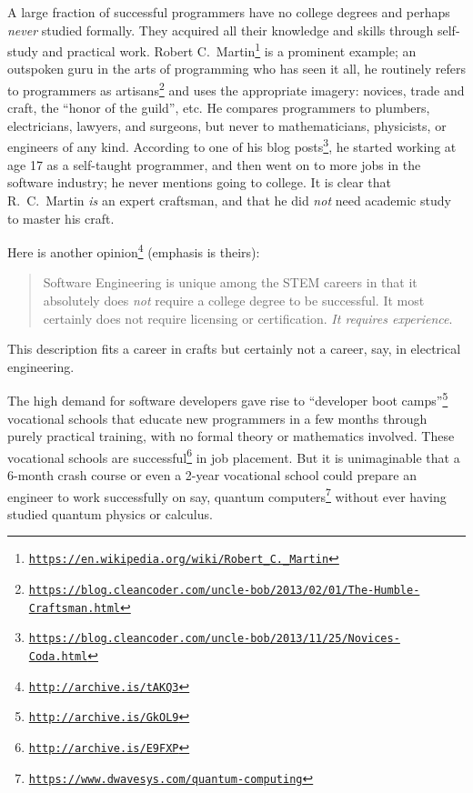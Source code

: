 A large fraction of successful programmers have no college degrees
and perhaps \emph{never} studied formally. They acquired all their
knowledge and skills through self-study and practical work. Robert
C.~Martin\footnote{\texttt{\href{https://en.wikipedia.org/wiki/Robert_C._Martin}{https://en.wikipedia.org/wiki/Robert\_C.\_Martin}}}
is a prominent example; an outspoken guru in the arts of programming
who has seen it all, he routinely refers to programmers as artisans\footnote{\texttt{\href{https://blog.cleancoder.com/uncle-bob/2013/02/01/The-Humble-Craftsman.html}{https://blog.cleancoder.com/uncle-bob/2013/02/01/The-Humble-Craftsman.html}}}
and uses the appropriate imagery: novices, trade and craft, the ``honor
of the guild'', etc. He compares programmers to plumbers, electricians,
lawyers, and surgeons, but never to mathematicians, physicists, or
engineers of any kind. According to one of his blog posts\footnote{\texttt{\href{https://blog.cleancoder.com/uncle-bob/2013/11/25/Novices-Coda.html}{https://blog.cleancoder.com/uncle-bob/2013/11/25/Novices-Coda.html}}},
he started working at age 17 as a self-taught programmer, and then
went on to more jobs in the software industry; he never mentions going
to college. It is clear that R.~C.~Martin \emph{is} an expert craftsman,
and that he did \emph{not} need academic study to master his craft.

Here is another opinion\footnote{\texttt{\href{http://archive.is/tAKQ3}{http://archive.is/tAKQ3}}}
(emphasis is theirs):
\begin{quotation}
{\small{}Software Engineering is unique among the STEM careers in
that it absolutely does }\emph{\small{}not}{\small{} require a college
degree to be successful. It most certainly does not require licensing
or certification. }\emph{\small{}It requires experience}{\small{}.}{\small\par}
\end{quotation}
This description fits a career in crafts \textendash{} but certainly
not a career, say, in electrical engineering.

The high demand for software developers gave rise to ``developer
boot camps''\footnote{\texttt{\href{http://archive.is/GkOL9}{http://archive.is/GkOL9}}}
\textemdash{} vocational schools that educate new programmers in a
few months through purely practical training, with no formal theory
or mathematics involved. These vocational schools are successful\footnote{\texttt{\href{http://archive.is/E9FXP}{http://archive.is/E9FXP}}}
in job placement. But it is unimaginable that a 6-month crash course
or even a 2-year vocational school could prepare an engineer to work
successfully on say, quantum computers\footnote{\texttt{\href{https://www.dwavesys.com/quantum-computing}{https://www.dwavesys.com/quantum-computing}}}
without ever having studied quantum physics or calculus.

